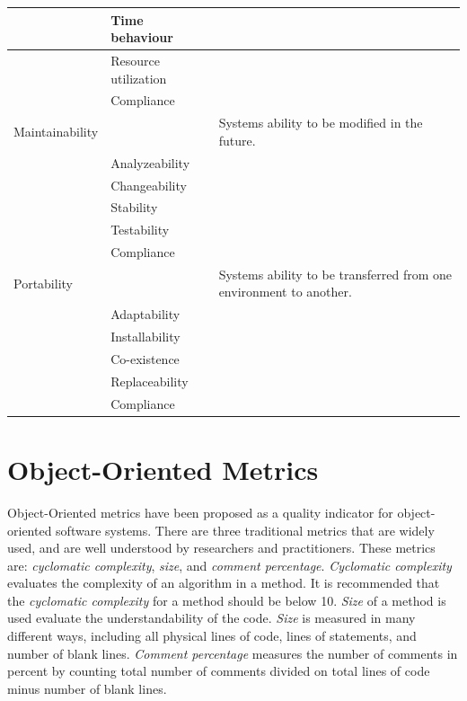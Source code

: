 \begin{table}[ht!]
{\begin{tabular}{|l|p{3cm}|p{5cm}|}
    ~                  & Time behaviour       & ~           \\ \hline
    ~                  & Resource utilization & ~           \\ \hline
    ~                  & Compliance       	  & ~           \\ \hline
    Maintainability    & ~                    & Systems ability to be modified in the future.           \\ \hline
    ~                  & Analyzeability       & ~           \\ \hline
    ~                  & Changeability        & ~           \\ \hline
    ~                  & Stability            & ~           \\ \hline
    ~                  & Testability          & ~           \\ \hline
    ~                  & Compliance       	  & ~           \\ \hline
    Portability        & ~                    & Systems ability to be transferred from one environment to another.          \\ \hline
    ~                  & Adaptability         & ~           \\ \hline
    ~                  & Installability       & ~           \\ \hline
    ~                  & Co-existence         & ~           \\ \hline
    ~                  & Replaceability       & ~           \\ \hline
    ~                  & Compliance       	  & ~           \\ \hline
    
    \end{tabular}}
\end{table}



\section{Object-Oriented Metrics}
\label{sec:oometrics}
Object-Oriented metrics have been proposed as a quality indicator for object-oriented software systems. There are three traditional metrics that are widely used, and are well understood by researchers and practitioners\cite{quenelobject}. These metrics are: \textit{cyclomatic complexity}, \textit{size}, and \textit{comment percentage}. \textit{Cyclomatic complexity} evaluates the complexity of an algorithm in a method. It is recommended that the \textit{cyclomatic complexity} for a method should be below 10\cite{quenelobject}. \textit{Size} of a method is used evaluate the understandability of the code. \textit{Size} is measured in many different ways, including all physical lines of code, lines of statements, and number of blank lines. \textit{Comment percentage} measures the number of comments in percent by counting total number of comments divided on total lines of code minus number of blank lines.

